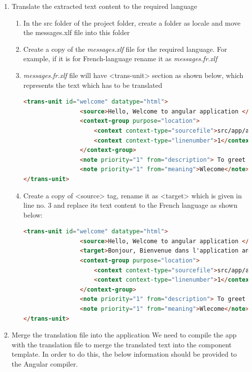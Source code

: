 \documentclass{report}
\begin{document}
\begin{enumerate}
\begin{enumerate}
\end{enumerate}
\item{Translate the extracted text content to the required language}
	\begin{enumerate}
		\item{In the src folder of the project folder, create a folder as locale and move the messages.xlf file into this folder}
		\item{Create a copy of the \textit{messages.xlf} file for the required language. For example, if it is for French-language rename it as \textit{messages.fr.xlf}}
		\item{\textit{messages.fr.xlf} file will have <trans-unit> section as shown below, which represents the text which has to be translated}

	\begin{lstlisting}[language=HTML]
	<trans-unit id="welcome" datatype="html">
				<source>Hello, Welcome to angular application </source>
				<context-group purpose="location">
					<context context-type="sourcefile">src/app/app.component.html</context>
					<context context-type="linenumber">1</context>
				</context-group>
				<note priority="1" from="description"> To greet the user </note>
				<note priority="1" from="meaning">Wlecome</note>
</trans-unit>
		\end{lstlisting}
	\item{Create a copy of <source> tag, rename it as <target> which is given in line no. 3 and replace its text content to the French language as shown below:}
		\begin{lstlisting}[language=HTML]
		<trans-unit id="welcome" datatype="html">
				<source>Hello, Welcome to angular application </source>
				<target>Bonjour, Bienvenue dans l'application angulaire</target>
				<context-group purpose="location">
					<context context-type="sourcefile">src/app/app.component.html</context>
					<context context-type="linenumber">1</context>
				</context-group>
				<note priority="1" from="description"> To greet the user </note>
				<note priority="1" from="meaning">Wlecome</note>
</trans-unit>
	\end{lstlisting}
\end{enumerate}
\item{Merge the translation file into the application}
	We need to compile the app with the translation file to merge the translated text into the component template. In order to do this, the below information should be provided to the Angular compiler.
	\begin{itemize}

\end{itemize}
\end{enumerate}
\end{document}
